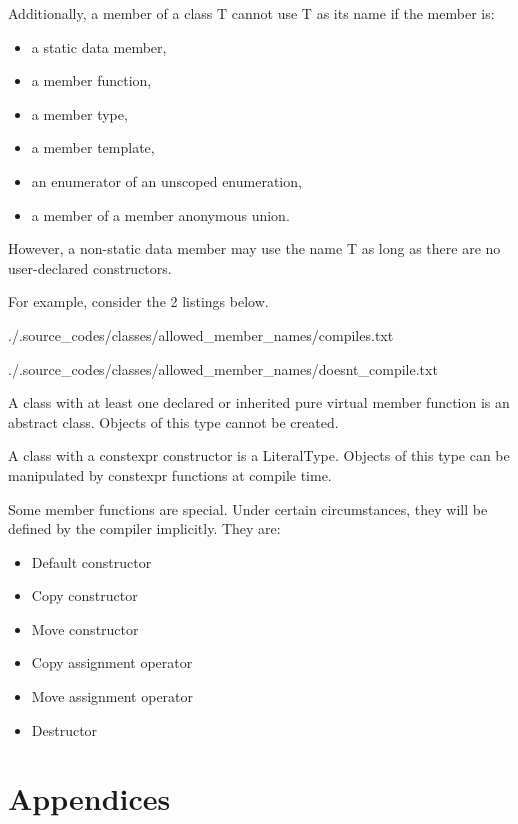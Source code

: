 \documentclass[a4paper, 12pt]{extbook}
\begin{document}

Additionally, a member of a class T cannot use T as its name if the member is:

\begin{itemize}
  \item a static data member,
  \item a member function,
  \item a member type,
  \item a member template,
  \item an enumerator of an unscoped enumeration,
  \item a member of a member anonymous union.
\end{itemize}

However, a non-static data member may use the name T as long as there are no user-declared constructors.

For example, consider the 2 listings below.


{./.source_codes/classes/allowed_member_names/compiles.txt}


{./.source_codes/classes/allowed_member_names/doesnt_compile.txt}

A class with at least one declared or inherited pure virtual member function is an abstract class.
Objects of this type cannot be created.

A class with a constexpr constructor is a LiteralType.
Objects of this type can be manipulated by constexpr functions at compile time.

Some member functions are special.
Under certain circumstances, they will be defined by the compiler implicitly.
They are:

\begin{itemize}
  \item Default constructor
  \item Copy constructor
  \item Move constructor
  \item Copy assignment operator
  \item Move assignment operator
  \item Destructor
\end{itemize}

\newpage
\section{Appendices}
\end{document}
